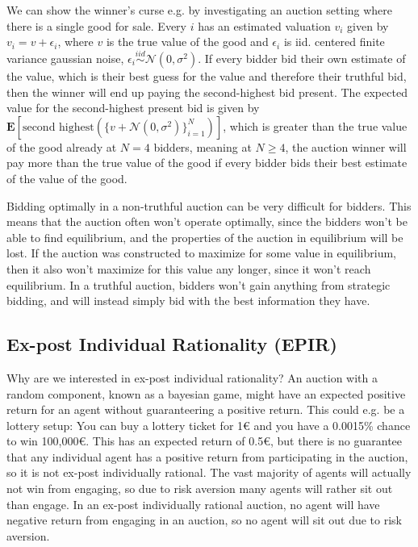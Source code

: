 We can show the winner's curse e.g. by investigating an auction setting where
there is a single good for sale. Every $i$ has an estimated valuation $v_i$
given by $v_i = v + \epsilon_i$, where $v$ is the true value of the good and
$\epsilon_i$ is iid. centered finite variance gaussian noise, $\epsilon_i
    \overset{iid}{\sim} \mathcal{N}(0,\sigma^2)$. If every bidder bid their own
estimate of the value, which is their best guess for the value and therefore
their truthful bid, then the winner will end up paying the second-highest bid
present. The expected value for the second-highest present bid is given by
$\mathbf{E}[\text{second highest}(\{v+\mathcal{N}(0,\sigma^2)\}_{i=1}^N)]$,
which is greater than the true value of the good already at $N=4$ bidders,
meaning at $N\geq4$, the auction winner will pay more than the true value of
the good if every bidder bids their best estimate of the value of the good.


Bidding optimally in a non-truthful auction can be very difficult for bidders.
This means that the auction often won't operate optimally, since the bidders
won't be able to find equilibrium, and the properties of the auction in
equilibrium will be lost. If the auction was constructed to maximize for some
value in equilibrium, then it also won't maximize for this value any longer,
since it won't reach equilibrium. In a truthful auction, bidders won't gain
anything from strategic bidding, and will instead simply bid with the best
information they have.

\subsection{Ex-post Individual Rationality (EPIR)}
Why are we interested in ex-post individual rationality? An auction with a
random component, known as a bayesian game, might have an expected positive
return for an agent without guaranteering a positive return. This could e.g. be
a lottery setup: You can buy a lottery ticket for 1€ and you have a 0.0015\%
chance to win 100,000€. This has an expected return of 0.5€, but there is no
guarantee that any individual agent has a positive return from participating in
the auction, so it is not ex-post individually rational. The vast majority of
agents will actually not win from engaging, so due to risk aversion many agents
will rather sit out than engage. In an ex-post individually rational auction,
no agent will have negative return from engaging in an auction, so no agent
will sit out due to risk aversion.

